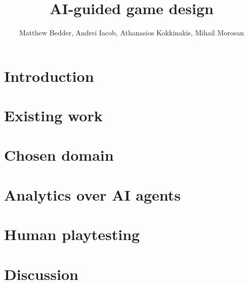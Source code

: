 \documentclass[9pt]{IEEEtran}
\title{AI-guided game design}
\author{Matthew Bedder, Andrei Iacob, Athanasios Kokkinakis, Mihail Morosan}
\begin{document}
\maketitle
\section{Introduction}

\section{Existing work}

\section{Chosen domain}

\section{Analytics over AI agents}

\section{Human playtesting}

\section{Discussion}


\printbibliography[heading=bibnumbered]
\end{document}
